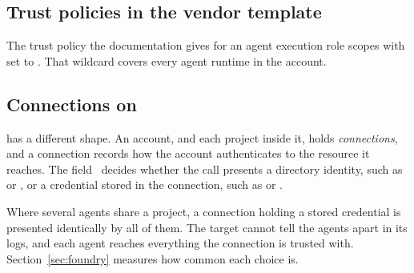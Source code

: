\subsection{Trust policies in the vendor template}

The trust policy the documentation gives for an agent execution role scopes
 with  set to
. That
wildcard covers every agent runtime in the account.

\subsection{Connections on \foundry}

\foundry has a different shape. An account, and each project inside it, holds
\emph{connections}, and a connection records how the account authenticates to
the resource it reaches. The  field~\cite{msFoundryConnections} decides whether the call
presents a directory identity, such as  or , or a
credential stored in the connection, such as  or .

Where several agents share a project, a connection holding a stored credential
is presented identically by all of them. The target cannot tell the agents
apart in its logs, and each agent reaches everything the connection is trusted
with. Section~\ref{sec:foundry} measures how common each choice is.
